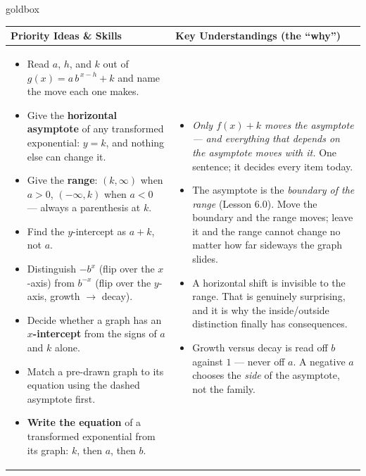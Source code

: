 \documentclass[10pt]{article}
\begin{document}
\renewcommand{\arraystretch}{1.4}
\begin{skillbox}{goldbox}
\begin{tabularx}{\linewidth}{@{}X|X@{}}
\textbf{Priority Ideas \& Skills} & \textbf{Key Understandings (the ``why'')} \\[2pt]
\hline
\vspace{-6pt}
\begin{itemize}[leftmargin=1.1em, nosep, after=\vspace{2pt}]
  \item Read $a$, $h$, and $k$ out of $g(x)=a\,b^{\,x-h}+k$ and name the move each one makes.
  \item Give the \textbf{horizontal asymptote} of any transformed exponential: $y=k$, and nothing else can change it.
  \item Give the \textbf{range}: $(k,\infty)$ when $a>0$, $(-\infty,k)$ when $a<0$ --- always a parenthesis at $k$.
  \item Find the $y$-intercept as $a+k$, not $a$.
  \item Distinguish $-b^{x}$ (flip over the $x$-axis) from $b^{-x}$ (flip over the $y$-axis, growth $\to$ decay).
  \item Decide whether a graph has an \textbf{$x$-intercept} from the signs of $a$ and $k$ alone.
  \item Match a pre-drawn graph to its equation using the dashed asymptote first.
  \item \textbf{Write the equation} of a transformed exponential from its graph: $k$, then $a$, then $b$.
\end{itemize}
&
\vspace{-6pt}
\begin{itemize}[leftmargin=1.1em, nosep, after=\vspace{2pt}]
  \item \emph{Only $f(x)+k$ moves the asymptote --- and everything that depends on the asymptote moves with it.} One sentence; it decides every item today.
  \item The asymptote is the \emph{boundary of the range} (Lesson 6.0). Move the boundary and the range moves; leave it and the range cannot change no matter how far sideways the graph slides.
  \item A horizontal shift is invisible to the range. That is genuinely surprising, and it is why the inside/outside distinction finally has consequences.
  \item Growth versus decay is read off $b$ against $1$ --- never off $a$. A negative $a$ chooses the \emph{side} of the asymptote, not the family.

\end{itemize}
\end{tabularx}
\end{skillbox}
\end{document}
